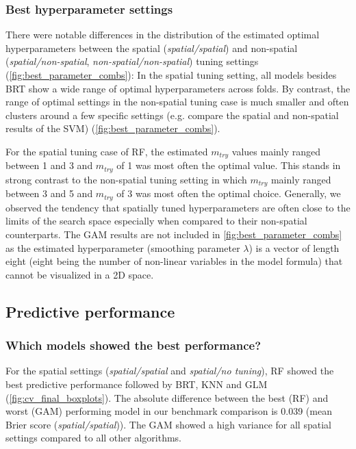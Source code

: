 \documentclass[review]{elsarticle}
\begin{document}
\subsubsection{Best hyperparameter settings}
There were notable differences in the distribution of the estimated optimal hyperparameters between the spatial (\emph{spatial/spatial}) and non-spatial (\emph{spatial/non-spatial}, \emph{non-spatial/non-spatial}) tuning settings (\autoref{fig:best_parameter_combs}): In the spatial tuning setting, all models besides BRT show a wide range of optimal hyperparameters across folds.
By contrast, the range of optimal settings in the non-spatial tuning case is much smaller and often clusters around a few specific settings (e.g. compare the spatial and non-spatial results of the SVM) (\autoref{fig:best_parameter_combs}).

For the spatial tuning case of RF, the estimated \texttt{$m_{try}$} values mainly ranged between 1 and 3 and \texttt{$m_{try}$} of 1 was most often the optimal value.
This stands in strong contrast to the non-spatial tuning setting in which \texttt{$m_{try}$} mainly ranged between 3 and 5 and \texttt{$m_{try}$} of 3 was most often the optimal choice.
Generally, we observed the tendency that spatially tuned hyperparameters are often close to the limits of the search space especially when compared to their non-spatial counterparts.
The GAM results are not included in \autoref{fig:best_parameter_combs} as the estimated hyperparameter (smoothing parameter $\lambda$) is a vector of length eight (eight being the number of non-linear variables in the model formula) that cannot be visualized in a 2D space.

\subsection{Predictive performance}
\label{subsec:pred_perf}

\subsubsection{Which models showed the best performance?}
For the spatial settings (\emph{spatial/spatial} and \emph{spatial/no tuning}), \ac{RF} showed the best predictive performance followed by BRT, KNN and GLM (\autoref{fig:cv_final_boxplots}).
The absolute difference between the best (RF) and worst (GAM) performing model in our benchmark comparison is 0.039 (mean Brier score (\emph{spatial/spatial})).
The GAM showed a high variance for all spatial settings compared to all other algorithms.
\end{document}
